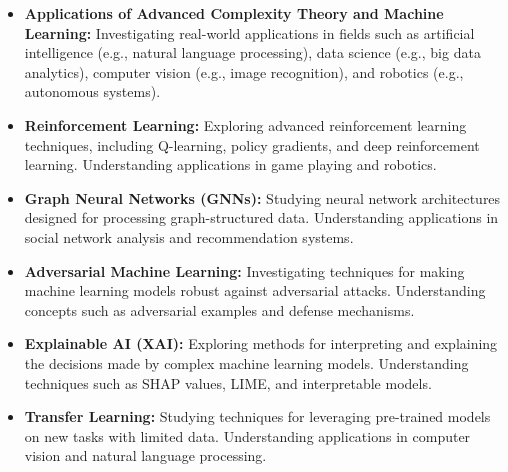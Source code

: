 \documentclass[openany]{book}
\begin{document}
\begin{itemize}
    \item \textbf{Applications of Advanced Complexity Theory and Machine Learning:} Investigating real-world applications in fields such as artificial intelligence (e.g., natural language processing), data science (e.g., big data analytics), computer vision (e.g., image recognition), and robotics (e.g., autonomous systems).
    \item \textbf{Reinforcement Learning:} Exploring advanced reinforcement learning techniques, including Q-learning, policy gradients, and deep reinforcement learning. Understanding applications in game playing and robotics.
    \item \textbf{Graph Neural Networks (GNNs):} Studying neural network architectures designed for processing graph-structured data. Understanding applications in social network analysis and recommendation systems.
    \item \textbf{Adversarial Machine Learning:} Investigating techniques for making machine learning models robust against adversarial attacks. Understanding concepts such as adversarial examples and defense mechanisms.
    \item \textbf{Explainable AI (XAI):} Exploring methods for interpreting and explaining the decisions made by complex machine learning models. Understanding techniques such as SHAP values, LIME, and interpretable models.
    \item  \textbf{Transfer Learning:} Studying techniques for leveraging pre-trained models on new tasks with limited data. Understanding applications in computer vision and natural language processing.
\end{itemize}
\end{document}
